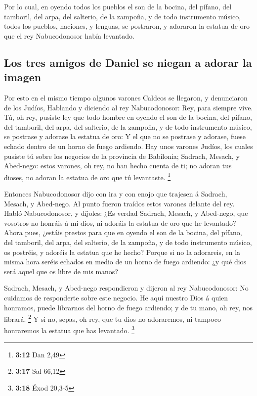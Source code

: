  Por lo cual, en oyendo todos los pueblos el son de la
bocina, del pífano, del tamboril, del arpa, del salterio, de la zampoña,
y de todo instrumento músico, todos los pueblos, naciones, y lenguas, se
postraron, y adoraron la estatua de oro que el rey Nabucodonosor había
levantado.

\hypertarget{los-tres-amigos-de-daniel-se-niegan-a-adorar-la-imagen}{%
\subsection{Los tres amigos de Daniel se niegan a adorar la
imagen}\label{los-tres-amigos-de-daniel-se-niegan-a-adorar-la-imagen}}

 Por esto en el mismo tiempo algunos varones Caldeos se
llegaron, y denunciaron de los Judíos,  Hablando y
diciendo al rey Nabucodonosor: Rey, para siempre vive. 
Tú, oh rey, pusiste ley que todo hombre en oyendo el son de la bocina,
del pífano, del tamboril, del arpa, del salterio, de la zampoña, y de
todo instrumento músico, se postrase y adorase la estatua de oro:
 Y el que no se postrase y adorase, fuese echado dentro
de un horno de fuego ardiendo.  Hay unos varones Judíos,
los cuales pusiste tú sobre los negocios de la provincia de Babilonia;
Sadrach, Mesach, y Abed-nego: estos varones, oh rey, no han hecho cuenta
de ti; no adoran tus dioses, no adoran la estatua de oro que tú
levantaste. \footnote{\textbf{3:12} Dan 2,49}

 Entonces Nabucodonosor dijo con ira y con enojo que
trajesen á Sadrach, Mesach, y Abed-nego. Al punto fueron traídos estos
varones delante del rey.  Habló Nabucodonosor, y díjoles:
¿Es verdad Sadrach, Mesach, y Abed-nego, que vosotros no honráis á mi
dios, ni adoráis la estatua de oro que he levantado? 
Ahora pues, ¿estáis prestos para que en oyendo el son de la bocina, del
pífano, del tamboril, del arpa, del salterio, de la zampoña, y de todo
instrumento músico, os postréis, y adoréis la estatua que he hecho?
Porque si no la adorareis, en la misma hora seréis echados en medio de
un horno de fuego ardiendo: ¿y qué dios será aquel que os libre de mis
manos?

 Sadrach, Mesach, y Abed-nego respondieron y dijeron al
rey Nabucodonosor: No cuidamos de responderte sobre este negocio.
 He aquí nuestro Dios á quien honramos, puede librarnos
del horno de fuego ardiendo; y de tu mano, oh rey, nos librará.
\footnote{\textbf{3:17} Sal 66,12}  Y si no, sepas, oh
rey, que tu dios no adoraremos, ni tampoco honraremos la estatua que has
levantado. \footnote{\textbf{3:18} Éxod 20,3-5}

